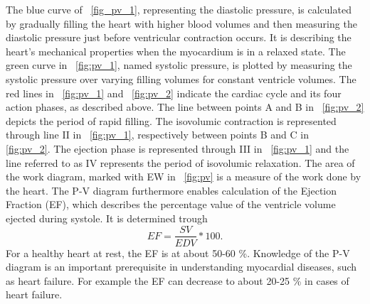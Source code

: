 The blue curve of \figurename~\ref{fig_pv_1}, representing the diastolic pressure, is calculated by gradually filling the heart with higher blood volumes and then measuring the diastolic pressure just before ventricular contraction occurs. It is describing the heart's mechanical properties when the myocardium is in a relaxed state. The green curve in \figurename~\ref{fig:pv_1}, named systolic pressure, is plotted by measuring the systolic pressure over varying filling volumes for constant ventricle volumes. The red lines in \figurename~\ref{fig:pv_1} and \figurename~\ref{fig:pv_2} indicate the cardiac cycle and its four action phases, as described above. The line between points A and B in \figurename~\ref{fig:pv_2} depicts the period of rapid filling. The isovolumic contraction is represented through line II in \figurename~\ref{fig:pv_1}, respectively between points B and C in \figurename~ \ref{fig:pv_2}. The ejection phase is represented through III in \figurename~\ref{fig:pv_1} and the line referred to as IV represents the period of isovolumic relaxation. The area of the work diagram, marked with EW in \figurename~\ref{fig:pv} is a measure of the work done by the heart. The P-V diagram furthermore enables calculation of the Ejection Fraction (EF), which describes the percentage value of the ventricle volume ejected during systole. It is determined trough
\begin{equation}
  EF = \frac{SV}{EDV}*100.
 \label{eq:EF}
\end{equation}
For a healthy heart at rest, the EF is at about 50-60 \%.
Knowledge of the P-V diagram is an important prerequisite in understanding myocardial diseases, such as heart failure. For example the EF can decrease to about 20-25 \% in cases of heart failure. \cite{HKS4}


